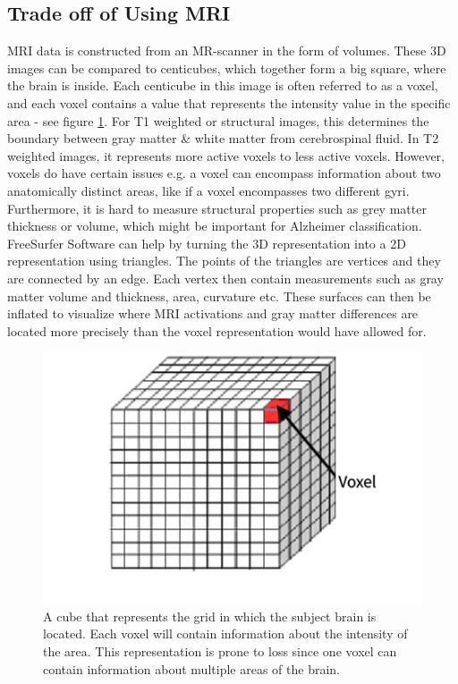 \documentclass[12pt, fleqn, titlepage]{article}
\newcommand{\1}[1]{\mathds{1}\left[#1\right]}
\begin{document}
\subsection{Trade off of Using MRI}

MRI data is constructed from an MR-scanner in the form of volumes. These 3D images can be compared to centicubes, which together form a big square, where the brain is inside. Each centicube in this image is often referred to as a voxel, and each voxel contains a value that represents the intensity value in the specific area - see figure \ref{fig:voxel}. For T1 weighted or structural images, this determines the boundary between gray matter \& white matter from cerebrospinal fluid. In T2 weighted images, it represents more active voxels to  less active voxels. However, voxels do have certain issues e.g. a voxel can encompass information about two anatomically distinct areas, like if a voxel encompasses two different gyri. Furthermore, it is hard to measure structural properties such as grey matter thickness or volume, which might be important for Alzheimer classification. FreeSurfer Software can help by turning the 3D representation into a 2D representation using triangles. The points of the triangles are vertices and they are connected by an edge. Each vertex then contain measurements such as gray matter volume and thickness, area, curvature etc. These surfaces can then be inflated to visualize where MRI activations and gray matter differences are located more precisely than the voxel representation would have allowed for. 

\begin{figure}[H]
	\centering
	\includegraphics[width=0.42\linewidth]{imgs/voxel}
	\caption{A cube that represents the grid in which the subject brain is located. Each voxel will contain information about the intensity of the area. This representation is prone to loss since one voxel can contain information about multiple areas of the brain.}
	\label{fig:voxel}
\end{figure}
\end{document}
